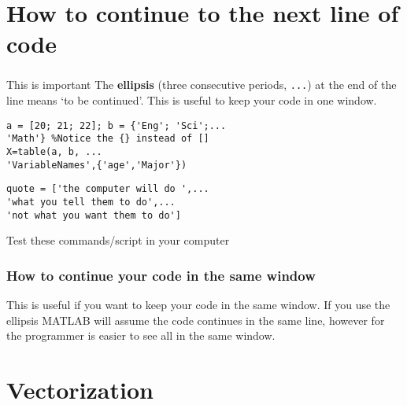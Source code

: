 \documentclass[11pt]{beamer}
\begin{document}
\section{How to continue to the next line of code}
\begin{frame}[fragile]
	\frametitle{\secname}
	
\begin{alertblock}{This is important}
	The \textbf{ellipsis} (three consecutive periods, \verb|...|) at the end of the line means `to be continued'. This is useful to keep your code in one window. 
\end{alertblock}
\vspace{-5pt}
\begin{lstlisting}[caption = {For codes and numerical variables}]
a = [20; 21; 22]; b = {'Eng'; 'Sci';...
'Math'} %Notice the {} instead of [] 
X=table(a, b, ...
'VariableNames',{'age','Major'})
\end{lstlisting}
\vspace{-5pt}
\begin{lstlisting}[caption = {For strings}]
quote = ['the computer will do ',...
'what you tell them to do',...
'not what you want them to do']
\end{lstlisting}
\vspace{-3pt}
\begin{block}{}
\centering Test these commands/script in your computer		
\end{block}

	
\end{frame}


\begin{frame}
	\frametitle{How to continue your code in the same window}
	
	
	
	\begin{block}{}
		This is useful if you want to keep your code in the same window. If you use the ellipsis MATLAB will assume the code continues in the same line, however for the programmer is easier to see all in the same window. 
	\end{block}
\end{frame}

\section{Vectorization}
\end{document}
